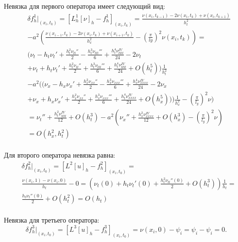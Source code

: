 {{		Невязка для первого оператора имеет следующий вид:
		\begin{align}
 &\delta f^1_h|_{ (x_i, t_k ) } = [ L^1_h[\nu]_h - f^1_h ]_{ (x_i, t_k ) } = \frac{\nu(x_i, t_{k-1})-2\nu(x_i, t_k)+\nu(x_i, t_{k+1})}{h^{2}_t}\nonumber\\
			 & - a^2\left(\frac{\nu(x_{i-1}, t_{k})-2\nu(x_i, t_k)+\nu(x_{i+1}, t_{k})}{h^{2}_x} - \left(\frac{\pi}{ly}\right)^2\nu(x_i, t_k)\right) = \nonumber\\
			 & (\nu_t-h_t\nu_t'+\frac{h^2_t\nu_{tt}''}{2}-\frac{h^3_t\nu_{ttt}'''}{6}+\frac{h^4_t\nu_{tttt}^{IV}}{24}-2\nu_t\nonumber\\ 
			& + \nu_t+h_t\nu_t'+\frac{h^2_t\nu_{tt}''}{2}+\frac{h^3_t\nu_{ttt}'''}{6}+\frac{h^4_t\nu_{tttt}^{IV}}{24}+ O(h^5_t))\frac{1}{h^2_t}\nonumber\\ 
			 & -a^2((\nu_x-h_x\nu_x'+\frac{h^2_x\nu_{xx}''}{2}-\frac{h^3_x\nu_{xxx}'''}{6}+\frac{h^4_x\nu_{xxxx}^{IV}}{24}-2\nu_x\nonumber\\ 
			& + \nu_x+h_x\nu_x'+\frac{h^2_x\nu_{xx}''}{2}+\frac{h^3_x\nu_{xxx}'''}{6}+\frac{h^4_t\nu_{xxxx}^{IV}}{24}+ O(h^5_x)))\frac{1}{h^2_x} - \left(\frac{\pi}{l_y}\right)^2 \nu)\nonumber\\ 		
			& = \nu_t'' + \frac{h^2_t\nu^{IV}_{tttt}}{12} + O(h^3_t) - a^2\left(\nu_x'' + \frac{h^2_x\nu^{IV}_{xxxx}}{12} + O(h^3_x) -\left(\frac{\pi}{l_y}\right)^2 \nu\right)\nonumber\\
			&= O(h^2_x, h^2_t)\nonumber\\
		\end{align}
		
		Для второго оператора невязка равна:
		\begin{equation}
		\begin{split}
			&\delta f^2_h|_{ (x_i, t_0 ) } = [L^2[u]_h - f^2_h]_{ (x_i, t_0 ) } = \\
			&\frac{\nu(x_i, 1) - \nu(x_i, 0)}{h_t} - 0 = 
			\left(\nu_t(0)+h_t\nu_t'(0)+\frac{h^2_t\nu_{tt}''(0)}{2} + O(h^3_t)\right)\frac{1}{h_t} = \nonumber\\
			&\frac{h_t\nu_t''(0)}{2} + O(h^2_t) = O(h_t)\nonumber\\
		\end{split}
		\end{equation}

		Невязка для третьего оператора:
		\begin{equation}
			\delta f^3_h|_{ (x_i, t_0 ) } = [L^3[u]_h - f^3_h]_{ (x_i, t_0 ) } = \nu(x_i , 0) - \psi_i = \psi_i - \psi_i = 0\nonumber.
		\end{equation}
		
}}
